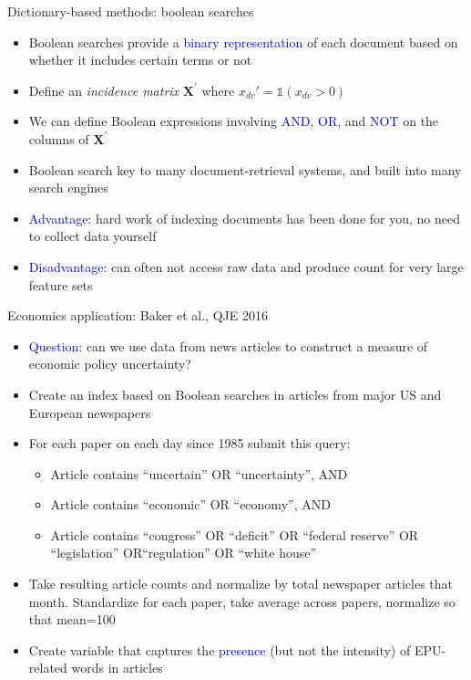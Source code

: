 \documentclass[english]{beamer}
\begin{document}
\begin{frame}{Dictionary-based methods: boolean searches}
\begin{itemize}
\setlength{\itemsep}{1em}
\item Boolean searches provide a \textcolor{blue}{binary representation} of each document based on whether it includes certain terms or not
\item Define an \textit{incidence matrix} $\mathbf { X } ^ { \prime }$ where $x_{dv}'=\mathds{1} \left( x_{dv} > 0 \right)$
\item We can define Boolean expressions involving \textcolor{blue}{AND}, \textcolor{blue}{OR}, and \textcolor{blue}{NOT} on the columns of $\mathbf { X } ^ { \prime }$

\item Boolean search key to many document-retrieval systems, and built into many search engines
\vspace{8pt}

\item\textcolor{blue}{Advantage}: hard work of indexing documents has been done for you, no need to collect data yourself

\item\textcolor{blue}{Disadvantage}: can often not access raw data and produce count for very large feature sets 

\end{itemize}
\end{frame}

\begin{frame}{Economics application: Baker et al., QJE 2016}
\begin{itemize}
\setlength{\itemsep}{0.9em}
\item \textcolor{blue}{Question}: can we use data from news articles to construct a measure of economic policy uncertainty?
\item Create an index based on Boolean searches in articles from major US and European newspapers
\item For each paper on each day since 1985 submit this query:
\vspace{3pt}
\begin{itemize}
\item Article contains ``uncertain'' OR ``uncertainty'', AND
\item   Article contains ``economic'' OR ``economy'', AND 
\item  Article contains ``congress'' OR ``deficit'' OR ``federal reserve'' OR ``legislation'' OR``regulation'' OR ``white house''
\end{itemize}
\item Take resulting article counts and normalize by total newspaper articles that month. Standardize for each paper, take average across papers, normalize so that mean=100

\item Create variable that captures the \textcolor{blue}{presence} (but not the intensity) of EPU-related words in articles
\end{itemize}
\end{frame}
\end{document}
